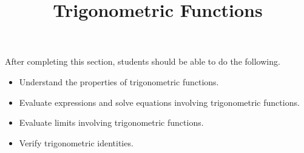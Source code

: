 \documentclass{ximera}
\title{Trigonometric Functions}
\begin{document}
\begin{abstract} 
\end{abstract}

\maketitle

\begin{sectionOutcomes}
After completing this section, students should be able to do the following.

\begin{itemize}
	\item Understand the properties of trigonometric functions.
	\item Evaluate expressions and solve equations involving
          trigonometric functions.
         \item Evaluate limits involving trigonometric functions.
         \item Verify trigonometric identities.
\end{itemize}
\end{sectionOutcomes}
\end{document}
